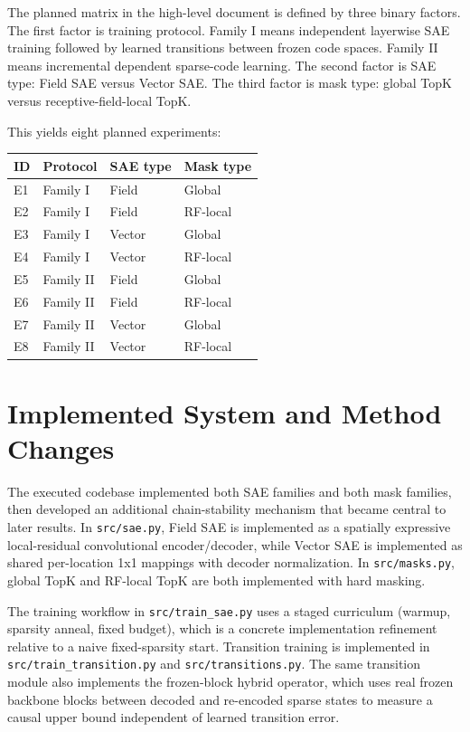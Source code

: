 \documentclass[11pt]{article}
\begin{document}
The planned matrix in the high-level document is defined by three binary factors. The first factor is training protocol. Family I means independent layerwise SAE training followed by learned transitions between frozen code spaces. Family II means incremental dependent sparse-code learning. The second factor is SAE type: Field SAE versus Vector SAE. The third factor is mask type: global TopK versus receptive-field-local TopK.

This yields eight planned experiments:
\begin{center}
\begin{tabular}{llll}
\toprule
ID & Protocol & SAE type & Mask type \\
\midrule
E1 & Family I & Field & Global \\
E2 & Family I & Field & RF-local \\
E3 & Family I & Vector & Global \\
E4 & Family I & Vector & RF-local \\
E5 & Family II & Field & Global \\
E6 & Family II & Field & RF-local \\
E7 & Family II & Vector & Global \\
E8 & Family II & Vector & RF-local \\
\bottomrule
\end{tabular}
\end{center}

\section{Implemented System and Method Changes}
The executed codebase implemented both SAE families and both mask families, then developed an additional chain-stability mechanism that became central to later results. In \texttt{src/sae.py}, Field SAE is implemented as a spatially expressive local-residual convolutional encoder/decoder, while Vector SAE is implemented as shared per-location 1x1 mappings with decoder normalization. In \texttt{src/masks.py}, global TopK and RF-local TopK are both implemented with hard masking.

The training workflow in \texttt{src/train\_sae.py} uses a staged curriculum (warmup, sparsity anneal, fixed budget), which is a concrete implementation refinement relative to a naive fixed-sparsity start. Transition training is implemented in \texttt{src/train\_transition.py} and \texttt{src/transitions.py}. The same transition module also implements the frozen-block hybrid operator, which uses real frozen backbone blocks between decoded and re-encoded sparse states to measure a causal upper bound independent of learned transition error.
\end{document}
